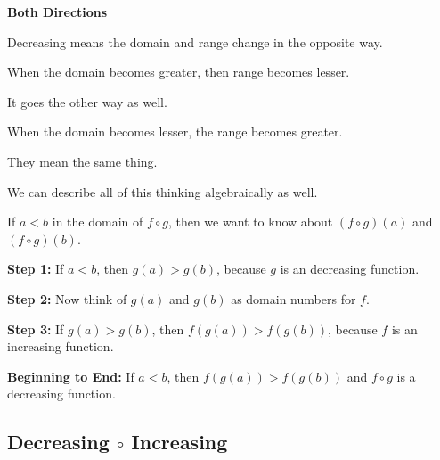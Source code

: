 \documentclass{ximera}
\begin{document}
\begin{warning} \textbf{\textcolor{red!70!black}{Both Directions}}

Decreasing means the domain and range change in the opposite way.

When the domain becomes greater, then range becomes lesser.

It goes the other way as well.

When the domain becomes lesser, the range becomes greater.

They mean the same thing.


\end{warning}






We can describe all of this thinking algebraically as well. 


If $a < b$ in the domain of $f \circ g$, then we want to know about $(f \circ g)(a)$  and $(f \circ g)(b)$.



\textbf{Step 1:}  If $a < b$, then $g(a) > g(b)$, because $g$ is an decreasing function.


\textbf{Step 2:}  Now think of $g(a)$  and $g(b)$ as domain numbers for $f$.


\textbf{Step 3:}  If $g(a) > g(b)$, then $f(g(a)) > f(g(b))$, because $f$ is an increasing function.


\textbf{Beginning to End:} If $a < b$, then $f(g(a)) > f(g(b))$ and $f \circ g$ is a decreasing function.






































\subsection*{Decreasing $\circ$ Increasing}
\end{document}
